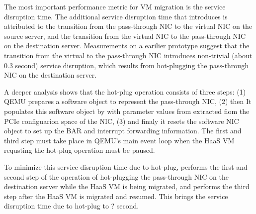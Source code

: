 The most important performance metric for VM migration is the service disruption time.
The additional service disruption time that \na introduces is attributed to the transition from
the pass-through NIC to the virtual NIC on the source server, and the transition from
the virtual NIC to the pass-through NIC on the destination server.
Measurements on a earilier \na prototype suggest that the transition from the virtual to the pass-through NIC introduces non-trivial (about 0.3 second) service disruption, which results from hot-plugging the pass-through NIC on the destination server. 

A deeper analysis shows that the hot-plug operation consists of three steps:
(1) QEMU prepares a software object to represent the pass-through
NIC, (2) then It populates this software object by with parameter values from extracted 
fiom the PCIe configuarion space of the NIC, (3) and finaly it
resets the software NIC object to set up the BAR and interrupt forwarding
information. The first and third step must take place in QEMU's main event
loop when the HaaS VM requsting the hot-plug operation must be paused.

To minimize this service disruption time due to hot-plug, 
\na performs the first and second step of the operation of hot-plugging the pass-through NIC
on the destination server while the HaaS VM is being migrated, and performs the third step after the HaaS VM is migrated and resumed. This brings the service disruption time due to hot-plug to ? second.


